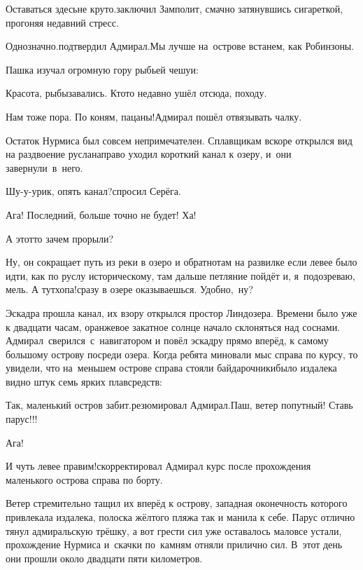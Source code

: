 \diagdash Оставаться здесь\mdash не круто.\mdash заключил Замполит, смачно затянувшись сигареткой, прогоняя недавний стресс.

\diagdash Однозначно.\mdash подтвердил Адмирал.\mdash Мы лучше на~острове встанем, как Робинзоны.

Пашка изучал огромную гору рыбьей чешуи:

\diagdash Красота, рыбы\mdash завались. Кто\sdash то недавно ушёл отсюда, походу.

\diagdash Нам тоже пора. По коням, пацаны!\mdash Адмирал пошёл отвязывать чалку.

Остаток Нурмиса был совсем непримечателен. Сплавщикам вскоре открылся вид на раздвоение русла\mdash направо уходил короткий канал к озеру, и~они завернули~в~него.

\diagdash Шу-у-урик, опять канал?\mdash спросил Серёга.

\diagdash Ага! Последний, больше точно не будет! Ха!

\diagdash А этот\sdash то зачем прорыли? 

\diagdash Ну, он сокращает путь из реки в озеро и обратно\mdash там на развилке если левее было идти, как по руслу историческому, там дальше петляние пойдёт и, я~подозреваю, мель. А тут\mdash хопа!\mdash сразу в озере оказываешься. Удобно,~ну?

Эскадра прошла канал, их взору открылся простор Линдозера. Времени было уже к двадцати часам, оранжевое закатное солнце начало склоняться над соснами. Адмирал~сверился~с~навигатором и повёл эскадру прямо вперёд, к самому большому острову посреди озера. Когда ребята миновали мыс справа по курсу, то увидели, что на~меньшем острове справа стояли байдарочники\mdash было издалека видно штук семь ярких плавсредств:

\diagdash Так, маленький остров забит.\mdash резюмировал Адмирал.\mdash Паш, ветер попутный! Ставь парус!!!

\diagdash Ага!

\diagdash И чуть левее правим!\mdash скорректировал Адмирал курс после прохождения маленького острова справа по борту.

Ветер стремительно тащил их вперёд к острову, западная оконечность которого привлекала издалека, полоска жёлтого пляжа так и манила к себе. Парус отлично тянул адмиральскую трёшку, а вот грести сил уже оставалось мало\mdash все устали, прохождение Нурмиса и~скачки по~камням отняли прилично сил. В~этот день они прошли около двадцати пяти километров.

